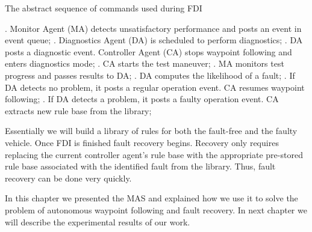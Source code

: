 \begin{algorithm}
\caption{The abstract sequence of commands used during FDI}
\label{algo:fdi}
\begin{algorithmic}
. Monitor Agent (MA) detects unsatisfactory performance and posts an event in event queue;
. Diagnostics Agent (DA) is scheduled to perform diagnostics;
. DA posts a diagnostic event.  Controller Agent (CA) stops waypoint following and enters diagnostics mode;
. CA starts the test maneuver;
. MA monitors test progress and passes results to DA;
. DA computes the likelihood of a fault;
. If DA detects no problem, it posts a regular operation event. CA resumes waypoint following;
. If DA detects a problem, it posts a faulty operation event. CA extracts new rule base from the library;
\end{algorithmic}
\end{algorithm}

Essentially we will build a library of rules for both the fault-free and the faulty vehicle.  Once FDI is finished fault recovery begins. Recovery only requires replacing the current controller agent's rule base with the appropriate pre-stored rule base associated with the identified fault from the library. Thus, fault recovery can be done very quickly. 

In this chapter we presented the MAS and explained how we use it to solve the problem of autonomous waypoint following and fault recovery. In next chapter we will describe the experimental results of our work.
